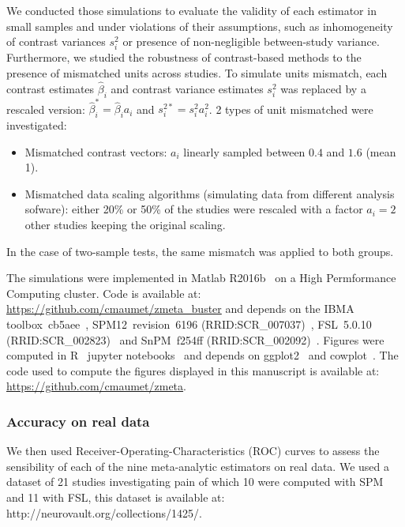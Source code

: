 \documentclass[preprint]{elsarticle}
\newcommand{\effectvector}{\hat\beta}
\newcommand{\effect}[1][i]{\effectvector_{#1}}
\newcommand{\effectunits}[1][i]{\effect[#1]^*}
\newcommand{\vareffect}[1][i]{s^2_{#1}}
\newcommand{\vareffectunits}[1][i]{s^{2*}_{#1}}
\begin{document}
We conducted those simulations to evaluate the validity of each estimator in small samples and under violations of their assumptions, such as inhomogeneity of contrast variances $\vareffect$ or presence of non-negligible between-study variance. Furthermore, we studied the robustness of contrast-based methods to the presence of mismatched units across studies. To simulate units mismatch, each contrast estimates $\effect$ and contrast variance estimates $\vareffect$ was replaced by a rescaled version: $\effectunits = \effect a_i$ and $\vareffectunits = \vareffect a_i^2$. 2 types of unit mismatched were investigated: 
\begin{itemize}
	\item Mismatched contrast vectors: $a_i$ linearly sampled between $0.4$ and $1.6$ (mean 1).
	\item Mismatched data scaling algorithms (simulating data from different analysis sofware): either 20\% or 50\% of the studies were rescaled with a factor $a_i = 2$ other studies keeping the original scaling.
\end{itemize}
In the case of two-sample tests, the same mismatch was applied to both groups.


The simulations were implemented in Matlab R2016b~\cite{release2016bmathworks} on a High Permformance Computing cluster. Code is available at: \url{https://github.com/cmaumet/zmeta_buster} and depends on the IBMA toolbox~cb5aee~\cite{Maumet2014}, SPM12~revision~6196 (RRID:SCR\_007037)~\cite{Friston2007}, FSL~5.0.10 (RRID:SCR\_002823)~\cite{Jenkinson2012} and SnPM~f254ff (RRID:SCR\_002092)~\cite{Nichols2002}. Figures were computed in R~\cite{RCoreTeam2016} jupyter notebooks~\cite{Perez2007} and depends on ggplot2~\cite{Hadley2009} and cowplot~\cite{Wilke2016}. The code used to compute the figures displayed in this manuscript is available at: \url{https://github.com/cmaumet/zmeta}.


\subsubsection{Accuracy on real data}
We then used Receiver-Operating-Characteristics (ROC) curves to assess the sensibility of each of the nine meta-analytic estimators on real data. We used a dataset of 21 studies investigating pain of which 10 were computed with SPM and 11 with FSL, this dataset is available at: http://neurovault.org/collections/1425/. 
\end{document}

